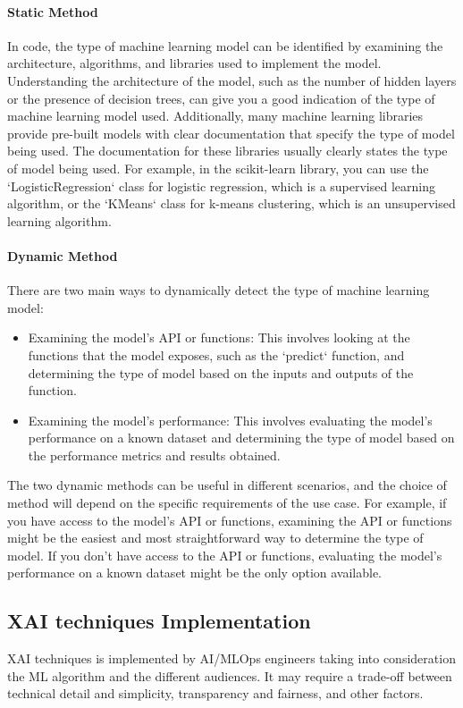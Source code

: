 \documentclass[conference]{IEEEtran}
\begin{document}
\paragraph{Static Method} In code, the type of machine learning model can be identified by examining the architecture, algorithms, and libraries used to implement the model. Understanding the architecture of the model, such as the number of hidden layers or the presence of decision trees, can give you a good indication of the type of machine learning model used. Additionally, many machine learning libraries provide pre-built models with clear documentation that specify the type of model being used. The documentation for these libraries usually clearly states the type of model being used. 
For example, in the scikit-learn library, you can use the `LogisticRegression` class for logistic regression, which is a supervised learning algorithm, or the `KMeans` class for k-means clustering, which is an unsupervised learning algorithm.
\paragraph{Dynamic Method}There are two main ways to dynamically detect the type of machine learning model:

\begin{itemize}
	\item Examining the model's API or functions: This involves looking at the functions that the model exposes, such as the `predict` function, and determining the type of model based on the inputs and outputs of the function.

	\item Examining the model's performance: This involves evaluating the model's performance on a known dataset and determining the type of model based on the performance metrics and results obtained.
\end{itemize}

The two dynamic methods can be useful in different scenarios, and the choice of method will depend on the specific requirements of the use case. For example, if you have access to the model's API or functions, examining the API or functions might be the easiest and most straightforward way to determine the type of model. If you don't have access to the API or functions, evaluating the model's performance on a known dataset might be the only option available.

\subsection{XAI techniques Implementation}
XAI techniques is implemented by AI/MLOps engineers taking into consideration the ML algorithm and the different audiences. It may require a trade-off between technical detail and simplicity, transparency and fairness, and other factors.
\end{document}
